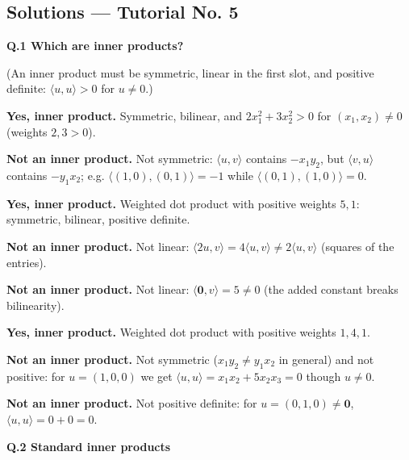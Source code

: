 \subsection*{Solutions --- Tutorial No. 5}
\medskip\noindent\textbf{Q.1  Which are inner products?}\par\smallskip
(An inner product must be symmetric, linear in the first slot, and positive definite: $\langle u,u\rangle>0$ for $u\ne0$.)
\begin{description}[leftmargin=1.2cm,itemsep=2pt]
\item[1.] \textbf{Yes, inner product.} Symmetric, bilinear, and $2x_1^2+3x_2^2>0$ for $(x_1,x_2)\ne0$ (weights $2,3>0$).
\item[2.] \textbf{Not an inner product.} Not symmetric: $\langle u,v\rangle$ contains $-x_1y_2$, but $\langle v,u\rangle$ contains $-y_1x_2$; e.g. $\langle(1,0),(0,1)\rangle=-1$ while $\langle(0,1),(1,0)\rangle=0$.
\item[3.] \textbf{Yes, inner product.} Weighted dot product with positive weights $5,1$: symmetric, bilinear, positive definite.
\item[4.] \textbf{Not an inner product.} Not linear: $\langle 2u,v\rangle=4\langle u,v\rangle\neq2\langle u,v\rangle$ (squares of the entries).
\item[5.] \textbf{Not an inner product.} Not linear: $\langle \mathbf0,v\rangle=5\neq0$ (the added constant breaks bilinearity).
\item[6.] \textbf{Yes, inner product.} Weighted dot product with positive weights $1,4,1$.
\item[7.] \textbf{Not an inner product.} Not symmetric ($x_1y_2\neq y_1x_2$ in general) and not positive: for $u=(1,0,0)$ we get $\langle u,u\rangle=x_1x_2+5x_2x_3=0$ though $u\neq0$.
\item[8.] \textbf{Not an inner product.} Not positive definite: for $u=(0,1,0)\ne\mathbf0$, $\langle u,u\rangle=0+0=0$.
\end{description}
\medskip\noindent\textbf{Q.2  Standard inner products}\par\smallskip

